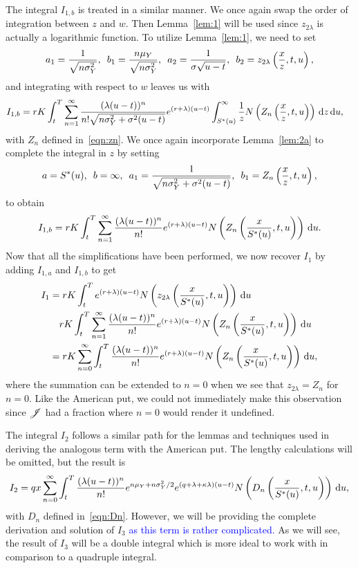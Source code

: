         	The integral $I_{1,b}$ is treated in a similar manner. We once again swap the order of integration between $z$ and $w$. Then Lemma~\ref{lem:1} will be used since $z_{2\lambda}$ is actually a logarithmic function. To utilize Lemma~\ref{lem:1}, we need to set
        		$$
        			a_1 = \frac{1}{\sqrt{n\sigma_Y^2}}, \enskip b_1 = \frac{n\mu_Y}{\sqrt{n\sigma_Y^2}}, \enskip
        			a_2 = \frac{1}{\sigma\sqrt{u-t}}, \enskip b_2 = z_{2\lambda}\left( \frac{x}{z}, t, u\right),
        		$$
	and integrating with respect to $w$ leaves us with
			\begin{align*}
				I_{1,b} &= rK  \int_t^T  \displaystyle\sum\limits_{n=1}^{\infty} \frac{(\lambda(u-t))^n}{n!\sqrt{n\sigma_Y^2 + \sigma^2(u-t)}}  e^{(r+\lambda)(u-t)} \int_{S^*(u)}^\infty \frac{1}{z}  N\left(Z_n \left( \frac{x}{z},t,u  \right) \right) \,\mathrm d z \, \mathrm d u,
			\end{align*}
	with $Z_n$ defined in~\eqref{eqn:zn}. We once again incorporate Lemma~\ref{lem:2a} to complete the integral in $z$ by setting 
		$$
			a = S^*(u), \enskip b = \infty, \enskip a_1 = \frac{1}{\sqrt{n\sigma_Y^2 + \sigma^2(u-t)}}, \enskip
			b_1 = Z_n\left( \frac{x}{z}, t, u \right),
		$$
		to obtain
		$$
			I_{1,b} = rK  \int_t^T  \displaystyle\sum\limits_{n=1}^{\infty} \frac{(\lambda(u-t))^n}{n!}  e^{(r+\lambda)(u-t)} N\left(Z_n \left( \frac{x}{S^*(u)},t,u  \right) \right) \, \mathrm d u.
		$$
		Now that all the simplifications have been performed, we now recover $I_1$ by adding $I_{1,a}$ and $I_{1,b}$ to get
		\begin{align}
			I_1 &= rK\int_t^T e^{(r+\lambda)(u-t)}N\left(z_{2\lambda}\left( \frac{x}{S^*(u)},t,u\right) \right) \, \mathrm d u \nonumber \\
			 &\quad rK  \int_t^T  \displaystyle\sum\limits_{n=1}^{\infty} \frac{(\lambda(u-t))^n}{n!}  e^{(r+\lambda)(u-t)} N\left(Z_n \left( \frac{x}{S^*(u)},t,u  \right) \right) \, \mathrm d u \nonumber \\
			 &= rK \displaystyle\sum\limits_{n=0}^{\infty}\int_t^T  \frac{(\lambda(u-t))^n}{n!} e^{(r+\lambda)(u-t)} N\left(Z_n \left( \frac{x}{S^*(u)},t,u  \right) \right) \, \mathrm d u, \label{eqn:I1call}
		\end{align}
		where the summation can be extended to $n=0$ when we see that $z_{2\lambda} = Z_n$ for $n=0$. Like the American put, we could not immediately make this observation since $\mathscr J$ had a fraction where $n=0$ would render it undefined. 
		
		The integral $I_2$ follows a similar path for the lemmas and techniques used in deriving the analogous term with the American put. The lengthy calculations will be omitted, but the result is
        	\begin{equation}
        		\label{eqn:I2put}
        		I_2 = qx  \displaystyle\sum\limits_{n=0}^{\infty}\int_t^T   \frac{(\lambda(u-t))^n}{n!} e^{n\mu_Y + n\sigma_Y^2/2} e^{(q+\lambda + \kappa\lambda)(u-t)} N\left( D_n \left( \frac{x}{S^*(u)},t,u  \right) \right) \, \mathrm d u,
        	\end{equation}
	with $D_n$ defined in~\eqref{eqn:Dn}. 
	However, we will be providing the complete derivation and solution of $I_3$ \textcolor{blue}{as this term is rather complicated.} As we will see, the result of $I_3$ will be a double integral which is more ideal to work with in comparison to a quadruple integral. 
	
